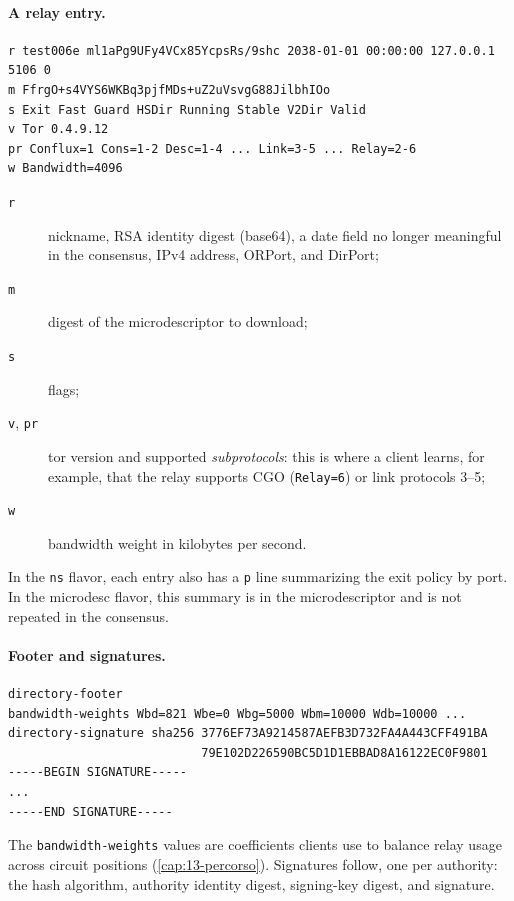 \paragraph{A relay entry.}
\begin{lstlisting}[numbers=none]
r test006e ml1aPg9UFy4VCx85YcpsRs/9shc 2038-01-01 00:00:00 127.0.0.1 5106 0
m FfrgO+s4VYS6WKBq3pjfMDs+uZ2uVsvgG88JilbhIOo
s Exit Fast Guard HSDir Running Stable V2Dir Valid
v Tor 0.4.9.12
pr Conflux=1 Cons=1-2 Desc=1-4 ... Link=3-5 ... Relay=2-6
w Bandwidth=4096
\end{lstlisting}
\begin{description}
  \item[\texttt{r}] nickname, RSA identity digest (base64), a date field no longer meaningful in the consensus, IPv4 address, ORPort, and DirPort;
  \item[\texttt{m}] digest of the microdescriptor to download;
  \item[\texttt{s}] flags;
  \item[\texttt{v}, \texttt{pr}] tor version and supported \emph{subprotocols}: this is where a client learns, for example, that the relay supports CGO (\texttt{Relay=6}) or link protocols 3--5;
  \item[\texttt{w}] bandwidth weight in kilobytes per second.
\end{description}
In the \texttt{ns} flavor, each entry also has a \texttt{p} line summarizing the exit policy by port. In the microdesc flavor, this summary is in the microdescriptor and is not repeated in the consensus.

\paragraph{Footer and signatures.}
\begin{lstlisting}[numbers=none]
directory-footer
bandwidth-weights Wbd=821 Wbe=0 Wbg=5000 Wbm=10000 Wdb=10000 ...
directory-signature sha256 3776EF73A9214587AEFB3D732FA4A443CFF491BA
                           79E102D226590BC5D1D1EBBAD8A16122EC0F9801
-----BEGIN SIGNATURE-----
...
-----END SIGNATURE-----
\end{lstlisting}
The \texttt{bandwidth-weights} values are coefficients clients use to balance relay usage across circuit positions (\cref{cap:13-percorso}). Signatures follow, one per authority: the hash algorithm, authority identity digest, signing-key digest, and signature.

